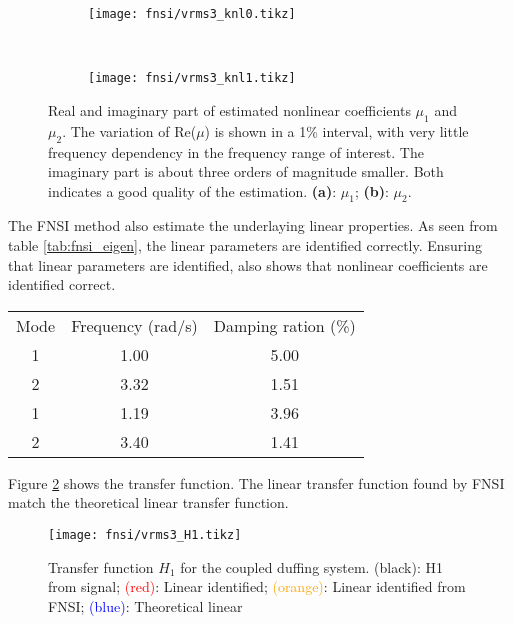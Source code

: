 \begin{figure}[!ht]
  \centering
  \begin{subfigure}[b]{0.45\textwidth}
    \texttt{[image: fnsi/vrms3\_knl0.tikz]}
    \caption{}
  \end{subfigure}
  ~
  \begin{subfigure}[b]{0.45\textwidth}
    \texttt{[image: fnsi/vrms3\_knl1.tikz]}
    \caption{}
  \end{subfigure}
  \caption{Real and imaginary part of estimated nonlinear coefficients $\mu_1$
    and $\mu_2$. The variation of Re($\mu$) is shown in a 1\% interval, with
    very little frequency dependency in the frequency range of interest.
    The imaginary part is about three orders of magnitude smaller. Both
    indicates a good quality of the estimation.
    \textbf{(a)}: $\mu_1$;
    \textbf{(b)}: $\mu_2$.
  }
  \label{fig:fnsi_knl}
\end{figure}

The FNSI method also estimate the underlaying linear properties. As seen from
table \ref{tab:fnsi_eigen}, the linear parameters are identified correctly.
Ensuring that linear parameters are identified, also shows that nonlinear
coefficients are identified correct.

\begin{center}
  \begin{tabular}{*{3}{c}}
    \hline
    Mode & Frequency (rad/s) & Damping ration (\%) \\
    1 & 1.00 & 5.00 \\
    2 & 3.32 & 1.51 \\
    \hline
    1 & 1.19 & 3.96 \\
    2 & 3.40 & 1.41 \\
    \hline
  \end{tabular}
  \label{tab:fnsi_eigen}
\end{center}

Figure \ref{fig:fnsi_H1} shows the transfer function. The linear transfer
function found by FNSI match the theoretical linear transfer function.

\begin{figure}[!ht]
  \centering
  \texttt{[image: fnsi/vrms3\_H1.tikz]}
  \caption{Transfer function $H_1$ for the coupled duffing system.
    \sampleline{}(black): H1 from signal;
    \textcolor{red}{(red)}: Linear identified;
    \textcolor{orange}{(orange)}: Linear identified from FNSI;
    \textcolor{blue}{(blue)}: Theoretical linear
  }
  \label{fig:fnsi_H1}
\end{figure}

